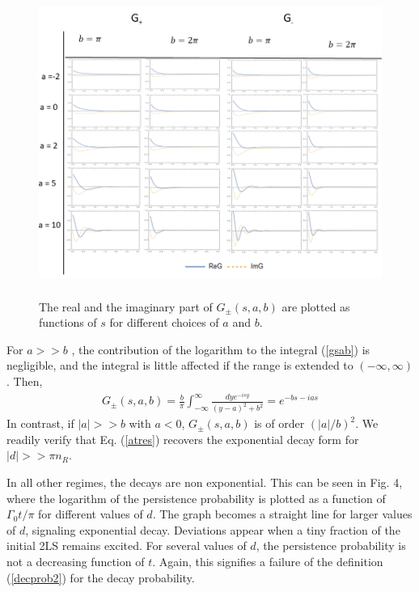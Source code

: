 \documentclass[12pt]{article}
\numberwithin{equation}{section}
\begin{document}
\begin{figure}
\includegraphics[height=10cm]{functionG}
\caption{The real and the imaginary part of   $G_{\pm}(s, a, b)$ are plotted as  functions of $s$ for different choices of $a$ and   $b$. }
\end{figure}
For  $a >>b $  , the contribution of the logarithm to the integral (\ref{gsab}) is negligible, and the integral is little affected if the range is extended to $(-\infty, \infty)$. Then,
\begin{eqnarray}
G_{\pm}(s, a, b) = \frac{b}{\pi}   \int_{-\infty}^{\infty} \frac{dy e^{-i    s y}}{(y- a )^2  + b^2 } = e^{-b s-ias}
\end{eqnarray}
In contrast, if $|a|>> b$ with $a <0$, $G_{\pm}(s, a, b)$ is of order $(|a|/b)^2$. We readily  verify  that Eq. (\ref{atres}) recovers the exponential decay form for $ |d| >> \pi n_R$.

In all other regimes, the decays are non exponential. This can be seen in  Fig. 4, where the logarithm of the persistence probability   is plotted as a function of $\Gamma_0t/\pi$ for different values of $d$. The graph becomes a straight line for larger values of $d$, signaling exponential decay. Deviations  appear when a tiny fraction of the initial  2LS remains excited. For several values of $d$, the persistence probability is not a decreasing function of $t$. Again, this signifies a failure of the definition (\ref{decprob2}) for the decay probability.
\end{document}
